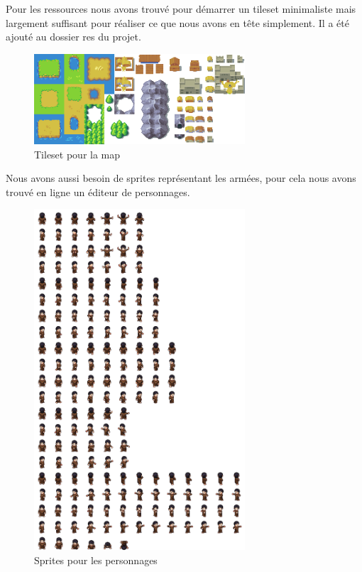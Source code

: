 \documentclass[a4paper,12pt]{article}
\begin{document}
\vspace{1\baselineskip}


Pour les ressources nous avons trouvé pour démarrer un tileset minimaliste mais largement suffisant pour réaliser ce que nous avons en tête simplement. Il a été ajouté au dossier res du projet.
\\

\begin{figure}[H]
\begin{center}
  \includegraphics[width=0.7\textwidth]{images/tileset.png}
  \caption{Tileset pour la map}
 \end{center}

\end{figure}

Nous avons aussi besoin de sprites représentant les armées, pour cela nous avons trouvé en ligne un éditeur de personnages.

\begin{figure}[H]
\begin{center}
  \includegraphics[width=0.7\textwidth]{images/sprite.png}
  \caption{Sprites pour les personnages}
 \end{center}

\end{figure}
\end{document}
